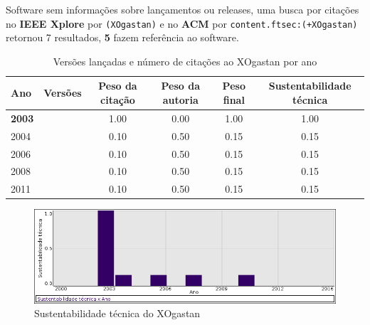 Software sem informações sobre lançamentos ou releases,
uma busca por citações no {\bf IEEE Xplore} por
\texttt{(XOgastan)}
e no {\bf ACM} por
\texttt{content.ftsec:(+XOgastan)}
retornou
7 resultados,
{\bf 5} fazem referência ao software.


\begin{table}[H]
\caption{Versões lançadas e número de citações ao XOgastan por ano}
\centering
\begin{tabular}{| l | c | c | c | c | c |}
  \hline
  Ano & Versões & Peso da citação & Peso da autoria & Peso final & Sustentabilidade técnica \\
  \hline
            {\bf 2003}
          &
          
          &
          1.00
          &
          0.00
          &
          1.00
          &
            {\color{blue} 1.00}
          \\
\hline
            2004
          &
          
          &
          0.10
          &
          0.50
          &
          0.15
          &
            {\color{red} 0.15}
          \\
\hline
            2006
          &
          
          &
          0.10
          &
          0.50
          &
          0.15
          &
            {\color{red} 0.15}
          \\
\hline
            2008
          &
          
          &
          0.10
          &
          0.50
          &
          0.15
          &
            {\color{red} 0.15}
          \\
\hline
            2011
          &
          
          &
          0.10
          &
          0.50
          &
          0.15
          &
            {\color{red} 0.15}
          \\
\hline
\end{tabular}
\end{table}

\begin{figure}[h]
  \center
  \includegraphics[scale=0.50]{imagens/softwares-charts/xogastan.png}
  \caption{Sustentabilidade técnica do XOgastan}
\end{figure}


